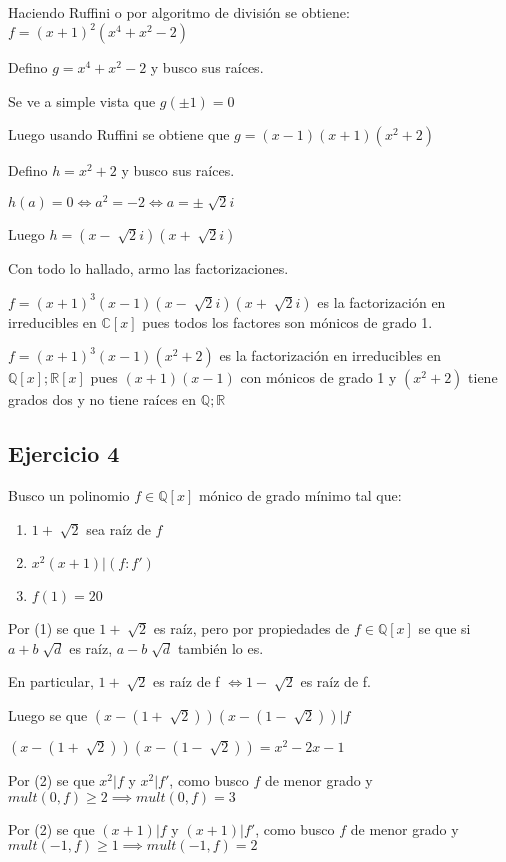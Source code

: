 Haciendo Ruffini o por algoritmo de división se obtiene: $ f = (x+1)^2(x^4+x^2-2) $

Defino $ g = x^4+x^2-2 $ y busco sus raíces.

Se ve a simple vista que $ g(\pm 1) = 0 $

Luego usando Ruffini se obtiene que $ g = (x-1)(x+1)(x^2 + 2) $

Defino $ h = x^2 + 2 $ y busco sus raíces.

$ h(a) = 0 \iff a^2 = -2 \iff a = \pm \sqrt[]{2}i $

Luego $ h = (x-\sqrt[]{2}i)(x+\sqrt[]{2}i) $

Con todo lo hallado, armo las factorizaciones.

$ f = (x+1)^3(x-1)(x-\sqrt[]{2}i)(x+\sqrt[]{2}i) $ es la factorización en irreducibles en $ \mathbb{C}[x] $ pues todos los factores son mónicos de grado 1. 

$ f = (x+1)^3(x-1)(x^2 + 2) $ es la factorización en irreducibles en $ \mathbb{Q}[x]; \mathbb{R}[x] $ pues $ (x+1)(x-1) $ con mónicos de grado 1 y $ (x^2+2) $ tiene grados dos y no tiene raíces en $ \mathbb{Q}; \mathbb{R} $

\subsection{Ejercicio 4}

Busco un polinomio $ f \in \mathbb{Q}[x] $ mónico de grado mínimo tal que:
\begin{enumerate}
    \item $ 1+\sqrt[]{2} $ sea raíz de $f$
    \item $ x^2(x+1) | (f:f') $
    \item $ f(1) = 20 $
\end{enumerate}
Por (1) se que $ 1+\sqrt[]{2} $ es raíz, pero por propiedades de $ f \in \mathbb{Q}[x] $ se que si $ a+b\sqrt[]{d} $ es raíz, $ a-b\sqrt[]{d} $ también lo es.

En particular, $ 1+\sqrt[]{2} $ es raíz de f $ \iff 1-\sqrt[]{2} $ es raíz de f.

Luego se que $ (x-(1+\sqrt[]{2}))(x-(1-\sqrt[]{2})) | f $

$ (x-(1+\sqrt[]{2}))(x-(1-\sqrt[]{2})) = x^2-2x-1 $  

Por (2) se que $ x^2 | f $ y $ x^2 | f' $, como busco $f$ de menor grado y $ mult(0,f) \geq 2 \implies mult(0,f) = 3 $

Por (2) se que $ (x+1) | f $ y $ (x+1) | f' $, como busco $f$ de menor grado y $ mult(-1,f) \geq 1 \implies mult(-1,f) = 2 $

